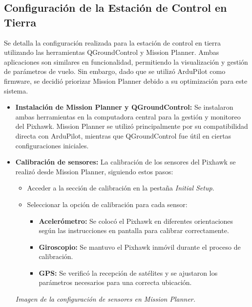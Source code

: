 \subsection{Configuración de la Estación de Control en Tierra} 
    Se detalla la configuración realizada para la estación de control en tierra utilizando las herramientas QGroundControl y Mission Planner. Ambas aplicaciones son similares en funcionalidad, permitiendo la visualización y gestión de parámetros de vuelo. Sin embargo, dado que se utilizó ArduPilot como firmware, se decidió priorizar Mission Planner debido a su optimización para este sistema.
    
    \begin{itemize}
        \item \textbf{Instalación de Mission Planner y QGroundControl:} 
        Se instalaron ambas herramientas en la computadora central para la gestión y monitoreo del Pixhawk. Mission Planner se utilizó principalmente por su compatibilidad directa con ArduPilot, mientras que QGroundControl fue útil en ciertas configuraciones iniciales.
    
        \item \textbf{Calibración de sensores:} 
        La calibración de los sensores del Pixhawk se realizó desde Mission Planner, siguiendo estos pasos:
        \begin{itemize}
            \item Acceder a la sección de calibración en la pestaña \textit{Initial Setup}.
            \item Seleccionar la opción de calibración para cada sensor:
            \begin{itemize}
                \item \textbf{Acelerómetro:} Se colocó el Pixhawk en diferentes orientaciones según las instrucciones en pantalla para calibrar correctamente.
                \item \textbf{Giroscopio:} Se mantuvo el Pixhawk inmóvil durante el proceso de calibración.
                \item \textbf{GPS:} Se verificó la recepción de satélites y se ajustaron los parámetros necesarios para una correcta ubicación.
            \end{itemize}
        \end{itemize}
        \begin{center} 
            \textit{Imagen de la configuración de sensores en Mission Planner.} 
        \end{center}
    

\end{itemize}
